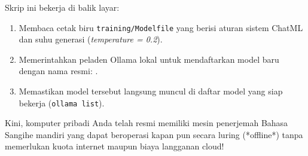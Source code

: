 Skrip ini bekerja di balik layar:
\begin{enumerate}
    \item Membaca cetak biru \texttt{training/Modelfile} yang berisi aturan sistem ChatML dan suhu generasi (\textit{temperature = 0.2}).
    \item Memerintahkan peladen Ollama lokal untuk mendaftarkan model baru dengan nama resmi: \textbf{\texttt{\StatFinetunedModel}}.
    \item Memastikan model tersebut langsung muncul di daftar model yang siap bekerja (\texttt{ollama list}).
\end{enumerate}

Kini, komputer pribadi Anda telah resmi memiliki mesin penerjemah Bahasa Sangihe mandiri yang dapat beroperasi kapan pun secara luring (*offline*) tanpa memerlukan kuota internet maupun biaya langganan cloud!
